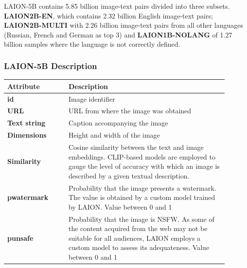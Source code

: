 LAION-5B contains 5.85 billion image-text pairs divided into three subsets. \textbf{LAION2B-EN}, which contains 2.32 billion English image-text pairs; \textbf{LAION2B-MULTI} with 2.26 billion image-text pairs from all other languages (Russian, French and German as top 3) and \textbf{LAION1B-NOLANG} of 1.27 billion samples where the language is not correctly defined. 

\subsubsection{LAION-5B Description}

\begin{table}[ht]
\centering
\begin{tabular}{|p{0.25\linewidth} | p{0.65\linewidth}|}
\hline
{\textbf{Attribute}} & {\textbf{Description}} \\ \hline
\textbf{id} & Image identifier \\ \hline
\textbf{URL} & URL from where the image was obtained \\ \hline
\textbf{Text string} & Caption accompanying the image \\ \hline
\textbf{Dimensions} & Height and width of the image \\ \hline
\textbf{Similarity} & Cosine similarity between the text and image embeddings. CLIP-based   models are employed to gauge the level of accuracy with which an image is   described by a given textual description.\\ \hline
\textbf{pwatermark} & Probability that the image presents a watermark. The value is   obtained by a custom model trained by LAION. Value between 0 and 1 \\ \hline
\textbf{punsafe} & Probability that the image is NSFW. As some of the content   acquired from the web may not be suitable for all audiences, LAION employs a   custom model to assess its adequateness. Value between 0 and 1 \\ \hline
\end{tabular}
\end{table}